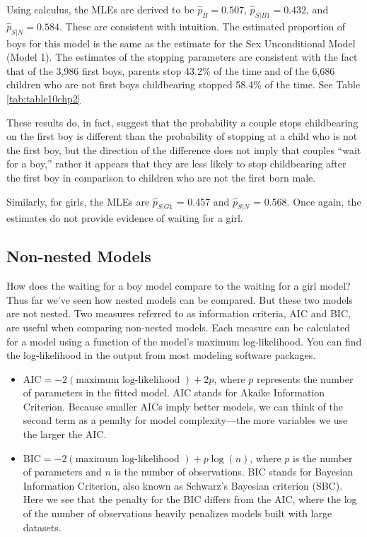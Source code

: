 \documentclass[
]{krantz}
\providecommand{\tightlist}{%
  \setlength{\itemsep}{0pt}\setlength{\parskip}{0pt}}
\begin{document}
Using calculus, the MLEs are derived to be \(\hat{p}_B = 0.507\), \(\hat{p}_{S|B1} = 0.432\), and \(\hat{p}_{S|N} = 0.584\). These are consistent with intuition. The estimated proportion of boys for this model is the same as the estimate for the Sex Unconditional Model (Model 1). The estimates of the stopping parameters are consistent with the fact that of the 3,986 first boys, parents stop 43.2\% of the time and of the 6,686 children who are not first boys childbearing stopped 58.4\% of the time. See Table \ref{tab:table10chp2}

These results do, in fact, suggest that the probability a couple stops childbearing on the first boy is different than the probability of stopping at a child who is not the first boy, but the direction of the difference does not imply that couples ``wait for a boy,'' rather it appears that they are less likely to stop childbearing after the first boy in comparison to children who are not the first born male.

Similarly, for girls, the MLEs are \(\hat{p}_{S|G1}\) = 0.457 and \(\hat{p}_{S|N}\) = 0.568. Once again, the estimates do not provide evidence of waiting for a girl.

\hypertarget{non-nested-models}{%
\subsection{Non-nested Models}\label{non-nested-models}}

How does the waiting for a boy model compare to the waiting for a girl model? Thus far we've seen how nested models can be compared. But these two models are not nested. Two measures referred to as information criteria, AIC and BIC, are useful when comparing non-nested models. Each measure can be calculated for a model using a function of the model's maximum log-likelihood. You can find the log-likelihood in the output from most modeling software packages.

\begin{itemize}
\tightlist
\item
  \(\textrm{AIC} = -2 (\textrm{maximum log-likelihood }) + 2p\), where \(p\) represents the number of parameters in the fitted model. AIC stands for Akaike Information Criterion. Because smaller AICs imply better models, we can think of the second term as a penalty for model complexity---the more variables we use the larger the AIC.
\item
  \(\textrm{BIC} = -2 (\textrm{maximum log-likelihood }) + p\log(n)\), where \(p\) is the number of parameters and \(n\) is the number of observations. BIC stands for Bayesian Information Criterion, also known as Schwarz's Bayesian criterion (SBC). Here we see that the penalty for the BIC differs from the AIC, where the log of the number of observations heavily penalizes models built with large datasets.
\end{itemize}
\end{document}
